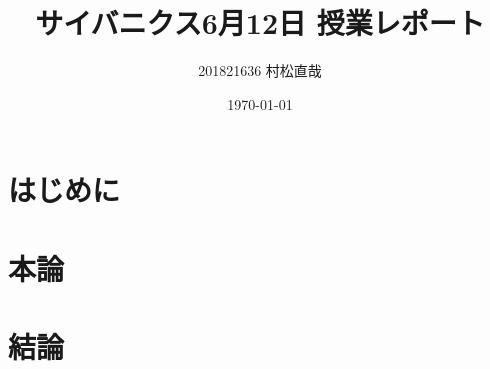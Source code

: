\documentclass[uplatex,a4paper]{jsarticle}
\title{サイバニクス6月12日 授業レポート}
\author{201821636 村松直哉}
\date{\today}
\begin{document}
\maketitle
%
%
\section{はじめに}


\section{本論}

\subsection{}



\section{結論}




\end{document}
